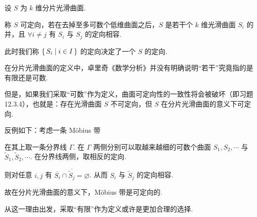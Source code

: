 \begin{definition}
    设 $S$ 为 $k$ 维分片光滑曲面.

    称 $S$ 可定向，若在去掉至多可数个低维曲面之后，$S$ 是若干个 $k$ 维光滑曲面 $S_i$ 的并，且 $\forall i\ne j$ 有 $S_i$ 与 $S_j$ 的定向相容.

    此时我们称 $\set{S_i|i\in I}$ 的定向决定了一个 $S$ 的定向.
\end{definition}


\begin{hint}
    在分片光滑曲面的定义中，卓里奇《数学分析》并没有明确说明“若干”究竟指的是有限还是可数.

    但是，如果我们采取“可数”作为定义，曲面可定向性的一致性将会被破坏（即习题 12.3.4），也就是：存在光滑曲面 $S$ 不可定向，但 $S$ 在分片光滑曲面的意义下可定向.

    反例如下：考虑一条 Möbius 带


    在其上取一条分界线 $\Gamma$. 在 $\Gamma$ 两侧分别可以取越来越细的可数个曲面 $S_1,S_2,\cdots$ 与 $\widetilde{S}_1,\widetilde{S}_2,\cdots$. 在分界线两侧，取相反的定向.

    则对任意 $i,j$ 有 $\overline{S_i}\cap\overline{\widetilde{S}_j}=\varnothing$. 从而 $S_i$ 与 $\widetilde{S}_j$ 的定向相容.

    故在分片光滑曲面的意义下，Möbius 带是可定向的.

    从这一理由出发，采取“有限”作为定义或许是更加合理的选择.
\end{hint}